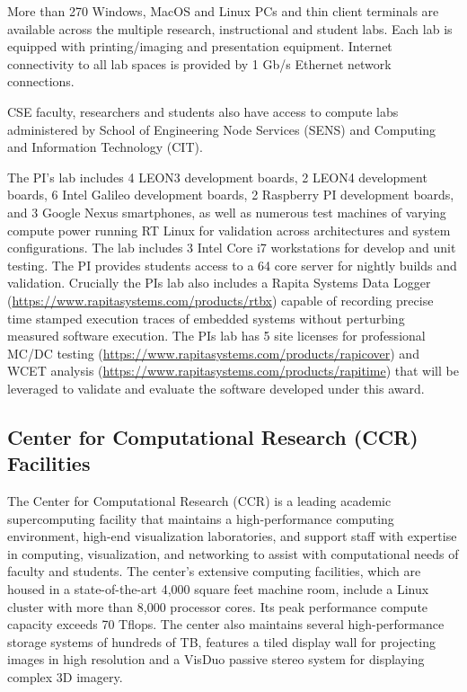 More than 270 Windows, MacOS and Linux PCs and thin client terminals are
available across the multiple research, instructional and student labs. Each
lab is equipped with printing/imaging and presentation equipment. Internet
connectivity to all lab spaces is provided by 1 Gb/s Ethernet network
connections.

CSE faculty, researchers and students also have access to compute labs
administered by School of Engineering Node Services (SENS) and Computing and
Information Technology (CIT).

The PI's lab includes 4 LEON3 development boards, 2 LEON4 development boards, 6 Intel Galileo development boards, 2 Raspberry PI development boards, and 3 Google Nexus smartphones, as well as numerous
test machines of varying compute power running RT Linux for validation across architectures and system
configurations.  The lab includes 3 Intel Core i7 workstations for develop and unit testing.  The PI provides
students access to a 64 core server for nightly builds and validation. Crucially the PIs lab also includes a Rapita Systems Data Logger (\url{https://www.rapitasystems.com/products/rtbx}) capable of recording precise time stamped execution traces of embedded systems without perturbing measured software execution.  The PIs lab has 5 site licenses for professional MC/DC testing (\url{https://www.rapitasystems.com/products/rapicover}) and WCET analysis (\url{https://www.rapitasystems.com/products/rapitime}) that will be leveraged to validate and evaluate the software developed under this award.

\subsection*{Center for Computational Research (CCR) Facilities}

The Center for Computational Research (CCR) is a leading academic
supercomputing facility that maintains a high-performance computing
environment, high-end visualization laboratories, and support staff with
expertise in computing, visualization, and networking to assist with
computational needs of faculty and students. The center's extensive
computing facilities, which are housed in a state-of-the-art 4,000 square
feet machine room, include a Linux cluster with more than 8,000 processor
cores. Its peak performance compute capacity exceeds 70 Tflops. The center
also maintains several high-performance storage systems of hundreds of TB,
features a tiled display wall for projecting images in high resolution and a
VisDuo passive stereo system for displaying complex 3D imagery. 

